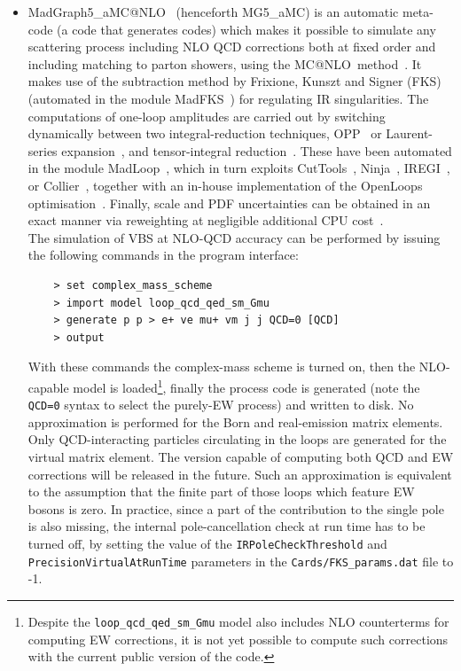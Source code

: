 \documentclass[twocolumn,epjc3]{svjour3} %
\begin{document}
\begin{itemize}
      \item {\sc MadGraph5\_aMC@NLO}~\cite{Alwall:2014hca} (henceforth {\sc MG5\_aMC}) is an automatic meta-code (a code that generates codes) which makes it possible to simulate any scattering process
          including NLO QCD corrections both at fixed order and including matching to parton showers, using the {\sc MC@NLO}\ method~\cite{Frixione:2002ik}. It makes use of the subtraction method by Frixione, Kunszt and Signer (FKS)~\cite{Frixione:1995ms,
            Frixione:1997np} (automated in the module {\sc MadFKS}~\cite{Frederix:2009yq,
            Frederix:2016rdc}) for regulating IR singularities. The computations of one-loop amplitudes are carried out by switching dynamically between
            two integral-reduction techniques, OPP~\cite{Ossola:2006us} or Laurent-series expansion~\cite{Mastrolia:2012bu},
            and tensor-integral reduction~\cite{Passarino:1978jh,Davydychev:1991va,Denner:2005nn}. These have been automated in the module {\sc MadLoop}~\cite{Hirschi:2011pa}, which
            in turn exploits {\sc CutTools}~\cite{Ossola:2007ax}, {\sc Ninja}~\cite{Peraro:2014cba,
            Hirschi:2016mdz}, {\sc IREGI}~\cite{ShaoIREGI}, or {\sc Collier}~\cite{Denner:2016kdg}, together with an in-house 
            implementation of the {\sc OpenLoops} optimisation~\cite{Cascioli:2011va}. Finally, scale and PDF uncertainties can be obtained in an exact manner via reweighting
            at negligible additional CPU cost~\cite{Frederix:2011ss}.\\
            The simulation of VBS at NLO-QCD accuracy can be performed by issuing the following commands in the program interface:
    \begin{verbatim}
    > set complex_mass_scheme
    > import model loop_qcd_qed_sm_Gmu
    > generate p p > e+ ve mu+ vm j j QCD=0 [QCD]
    > output
    \end{verbatim}
      With these commands the complex-mass scheme is turned on, then the NLO-capable model is loaded\footnote{Despite
                the {\tt loop\_qcd\_qed\_sm\_Gmu} model also includes NLO counterterms for computing EW corrections, it is not yet possible to compute such corrections
            with the current public version of the code.}, finally the process code is generated (note the {\tt QCD=0} syntax to select the purely-EW process)
            and written to disk. No approximation is performed for the Born and real-emission matrix elements. 
            Only QCD-interacting particles circulating in the loops are generated for the virtual matrix element.
            The version capable of computing both QCD and EW corrections will be released in the future.
            Such an approximation is equivalent to the assumption that the finite part of
            those loops which feature EW bosons is zero. In practice, since a part of the contribution to the single pole is also missing, the internal 
            pole-cancellation check at run time has to be turned off, by setting the value of the {\tt IR\-Pole\-Check\-Threshold} and 
            {\tt Precision\-Virtual\-At\-Run\-Time} parameters in the {\tt Cards\-/FKS\_\-params.dat} file to -1.


\end{itemize}
\end{document}
